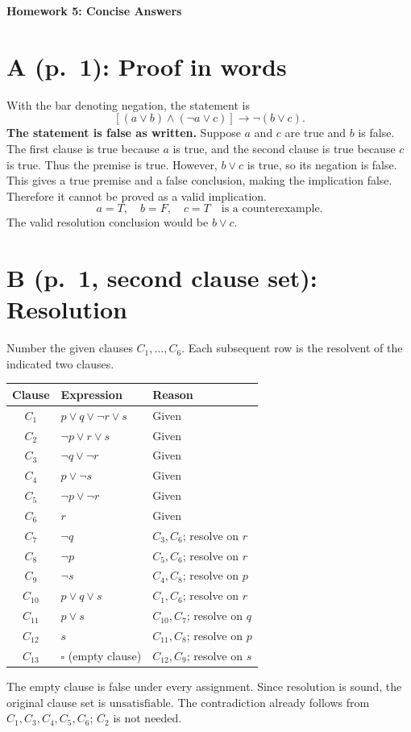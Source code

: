 \documentclass[11pt,a4paper]{article}
\begin{document}
\begin{center}{\Large\bfseries Homework 5: Concise Answers}\end{center}

\section*{A (p.\ 1): Proof in words}
With the bar denoting negation, the statement is
\[
[(a\lor b)\land(\neg a\lor c)]\to\neg(b\lor c).
\]
\textbf{The statement is false as written.} Suppose $a$ and $c$ are true
and $b$ is false. The first clause is true because $a$ is true, and the
second clause is true because $c$ is true. Thus the premise is true.
However, $b\lor c$ is true, so its negation is false.
This gives a true premise and a false conclusion, making the implication
false. Therefore it cannot be proved as a valid implication.
\[
\boxed{a=T,\quad b=F,\quad c=T\quad\text{is a counterexample}.}
\]
The valid resolution conclusion would be $b\lor c$.

\section*{B (p.\ 1, second clause set): Resolution}
Number the given clauses $C_1,\ldots,C_6$.
Each subsequent row is the resolvent of the indicated two clauses.
\begin{center}
\renewcommand{\arraystretch}{1.16}
\begin{tabular}{c|l|l}
\toprule
Clause&Expression&Reason\\
\midrule
$C_1$&$p\lor q\lor\neg r\lor s$&Given\\
$C_2$&$\neg p\lor r\lor s$&Given\\
$C_3$&$\neg q\lor\neg r$&Given\\
$C_4$&$p\lor\neg s$&Given\\
$C_5$&$\neg p\lor\neg r$&Given\\
$C_6$&$r$&Given\\
\midrule
$C_7$&$\neg q$&$C_3,C_6$; resolve on $r$\\
$C_8$&$\neg p$&$C_5,C_6$; resolve on $r$\\
$C_9$&$\neg s$&$C_4,C_8$; resolve on $p$\\
$C_{10}$&$p\lor q\lor s$&$C_1,C_6$; resolve on $r$\\
$C_{11}$&$p\lor s$&$C_{10},C_7$; resolve on $q$\\
$C_{12}$&$s$&$C_{11},C_8$; resolve on $p$\\
$C_{13}$&$\square$ (empty clause)&$C_{12},C_9$; resolve on $s$\\
\bottomrule
\end{tabular}
\end{center}
The empty clause is false under every assignment. Since resolution is
sound, the original clause set is $\boxed{\text{unsatisfiable}}$.
The contradiction already follows from $C_1,C_3,C_4,C_5,C_6$;
$C_2$ is not needed.
\end{document}
